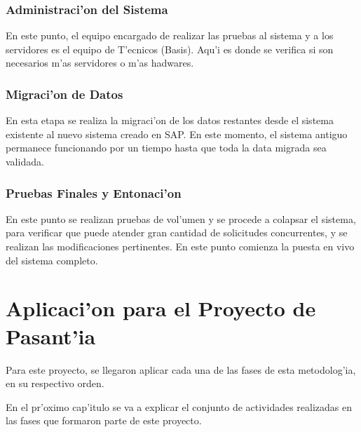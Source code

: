 \subsubsection{Administraci'on del Sistema}
	En este punto, el equipo encargado de realizar las pruebas al sistema y a los servidores es el equipo de T'ecnicos (Basis). Aqu'i es donde se verifica si son necesarios m'as servidores o m'as hadwares.
	
\subsubsection{Migraci'on de Datos}
	En esta etapa se realiza la migraci'on de los datos restantes desde el sistema existente al nuevo sistema creado en SAP. En este momento, el sistema antiguo permanece funcionando por un tiempo hasta que toda la data migrada sea validada. 
	
\subsubsection{Pruebas Finales y Entonaci'on}
	En este punto se realizan pruebas de vol'umen y se procede  a colapsar el sistema, para verificar que puede atender gran cantidad de solicitudes concurrentes, y se realizan las modificaciones pertinentes. En este punto comienza la puesta en vivo del sistema completo.

\section{Aplicaci'on para el Proyecto de Pasant'ia}
	Para este proyecto, se llegaron aplicar cada una de las fases de esta metodolog'ia, en su respectivo orden.
	
	En el pr'oximo cap'itulo se va a explicar el conjunto de actividades realizadas en las fases que formaron parte de este proyecto.